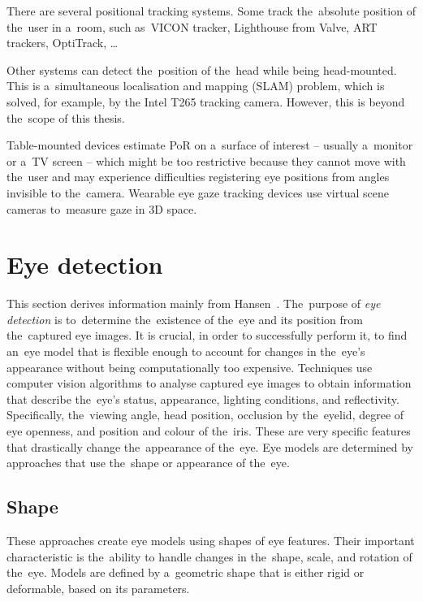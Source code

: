 There are several positional tracking systems. Some track the~absolute position of the~user in a~room, such as~VICON tracker, Lighthouse from Valve, ART trackers, OptiTrack, \ldots

Other systems can detect the~position of the~head while being head-mounted. This is a~simultaneous localisation and mapping (SLAM) problem, which is solved, for example, by the Intel T265 tracking camera. However, this is beyond the~scope of this thesis.

Table-mounted devices estimate PoR on a~surface of interest -- usually a~monitor or a~TV screen -- which might be too restrictive because they cannot move with the~user and may experience difficulties registering eye positions from angles invisible to the~camera. Wearable eye gaze tracking devices use virtual scene cameras to~measure gaze in 3D space.~\cite{cognolato2018}

\section{Eye detection}
\label{sec:eye-detection}

This section derives information mainly from Hansen~\cite{hansen2010}. The~purpose of \emph{eye detection} is to~determine the~existence of the~eye and its position from the~captured eye images. It is crucial, in order to successfully perform it, to find an~eye model that is flexible enough to account for changes in the~eye's appearance without being computationally too expensive. Techniques use computer vision algorithms to analyse captured eye images to obtain information that describe the~eye's status, appearance, lighting conditions, and reflectivity. Specifically, the~viewing angle, head position, occlusion by the~eyelid, degree of eye openness, and position and colour of the~iris. These are very specific features that drastically change the~appearance of the~eye.
Eye models are determined by approaches that use the~shape or appearance of the~eye. 

\subsection{Shape}

These approaches create eye models using shapes of eye features. Their important characteristic is the~ability to handle changes in the~shape, scale, and rotation of the~eye. Models are defined by a~geometric shape that is either rigid or deformable, based on its parameters. 

